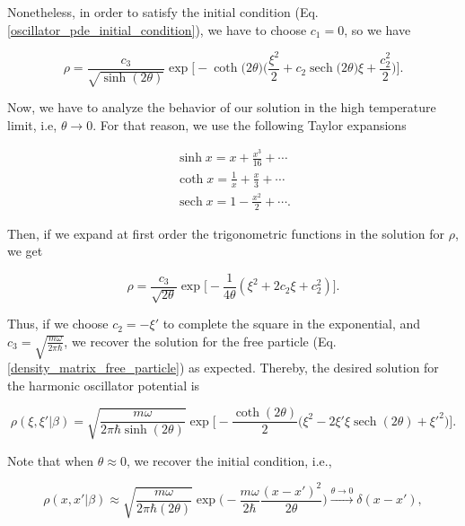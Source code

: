 \documentclass{article}
\DeclareMathOperator{\sech}{sech}
\begin{document}
Nonetheless, in order to satisfy the initial condition (Eq. \ref{oscillator_pde_initial_condition}), we have to choose $c_{1}=0$, so we have

\begin{equation}
    \rho = \frac{c_{3}}{\sqrt{\sinh(2\theta)}} \exp \bigg[ -\coth \big(2\theta) \bigg( \frac{\xi^{2}}{2} + c_{2} \sech \big( 2\theta \big)\xi + \frac{c_{2}^{2}}{2} \bigg) \bigg]. 
\end{equation}

Now, we have to analyze the behavior of our solution in the high temperature limit, i.e, $\theta \longrightarrow 0$. For that reason, we use the following Taylor expansions

\begin{equation}
    \begin{split}
        \sinh x = x + \frac{x^{3}}{16} + \cdots \\ \coth x = \frac{1}{x} + \frac{x}{3} + \cdots \\ \sech x = 1 - \frac{x^{2}}{2} + \cdots.
    \end{split}
\end{equation}

Then, if we expand at first order the trigonometric functions in the solution for $\rho$, we get

\begin{equation}
    \rho = \frac{c_{3}}{\sqrt{2\theta}} \exp \big[ -\frac{1}{4\theta}(\xi^{2} + 2c_{2}\xi + c_{2}^{2}) \big].
\end{equation}

Thus, if we choose $c_{2}=-\xi'$ to complete the square in the exponential, and $c_{3} = \sqrt{\frac{m\omega}{2\pi \hbar}}$, we recover the solution for the free particle (Eq. \ref{density_matrix_free_particle}) as expected. Thereby, the desired solution for the harmonic oscillator potential is

\begin{equation}\label{harmonic_osc_density_matrix}
    \rho(\xi, \xi'|\beta) = \sqrt{\frac{m\omega}{2\pi \hbar \sinh(2\theta)}} \exp \Bigg[ -\frac{\coth(2\theta)}{2} \big( \xi^{2} - 2\xi' \xi \sech(2\theta) + \xi'^{2} \big) \Big].
\end{equation}

Note that when $\theta \approx 0$, we recover the initial condition, i.e.,

\begin{equation}
    \rho(x, x' | \beta) \approx \sqrt{\frac{m\omega}{2\pi\hbar (2\theta)}} \exp \bigg(- \frac{m\omega}{2\hbar} \frac{(x-x')^{2}}{2\theta} \bigg) \xrightarrow{\theta \longrightarrow 0} \delta(x-x'),
\end{equation}
\end{document}
